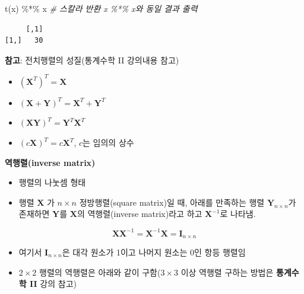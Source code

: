 \documentclass[
  11pt,
]{krantz}
\makeatletter
\newenvironment{Shaded}{\begin{snugshade}}{\end{snugshade}}
\newcommand{\CommentTok}[1]{\textcolor[rgb]{0.37,0.37,0.37}{\textit{#1}}}
\newcommand{\FunctionTok}[1]{\textcolor[rgb]{0,0,0}{#1}}
\newcommand{\NormalTok}[1]{#1}
\newcommand{\SpecialCharTok}[1]{\textcolor[rgb]{0,0,0}{#1}}
\providecommand{\tightlist}{%
  \setlength{\itemsep}{0pt}\setlength{\parskip}{0pt}}
\newenvironment{kframe}{%
\medskip{}
\setlength{\fboxsep}{.8em}
 \def\at@end@of@kframe{}%
 \ifinner\ifhmode%
  \def\at@end@of@kframe{\end{minipage}}%
  \begin{minipage}{\columnwidth}%
 \fi\fi%
 \def\FrameCommand##1{\hskip\@totalleftmargin \hskip-\fboxsep
 \colorbox{shadecolor}{##1}\hskip-\fboxsep
     \hskip-\linewidth \hskip-\@totalleftmargin \hskip\columnwidth}%
 \MakeFramed {\advance\hsize-\width
   \@totalleftmargin\z@ \linewidth\hsize
   \@setminipage}}%
 {\par\unskip\endMakeFramed%
 \at@end@of@kframe}
\newenvironment{rmdblock}[1]
  {
  \begin{itemize}
  \renewcommand{\labelitemi}{
    \raisebox{-.7\height}[0pt][0pt]{
      {\setkeys{Gin}{width=3em,keepaspectratio}\texttt{[image: images/\#1]}}
    }
  }
  \setlength{\fboxsep}{1em}
  \begin{kframe}
  \item
  }
  {
  \end{kframe}
  \end{itemize}
  }
\newenvironment{rmdtip}
  {\begin{rmdblock}{tip}}
  {\end{rmdblock}}
\makeatother
\begin{document}
\begin{Shaded}
\begin{Highlighting}[]
\FunctionTok{t}\NormalTok{(x) }\SpecialCharTok{\%*\%}\NormalTok{ x }\CommentTok{\# 스칼라 반환 x \%*\% x와 동일 결과 출력}
\end{Highlighting}
\end{Shaded}

\begin{verbatim}
     [,1]
[1,]   30
\end{verbatim}

\normalsize

\footnotesize

\begin{rmdtip}
\textbf{참고}: 전치행렬의 성질(통계수학 II 강의내용 참고)

\begin{itemize}
\tightlist
\item
  \((\mathrm{\mathbf{X}}^T)^T = \mathrm{\mathbf{X}}\)
\item
  \((\mathrm{\mathbf{X} + \mathbf{Y}})^T = \mathrm{\mathbf{X}}^T + \mathrm{\mathbf{Y}}^T\)
\item
  \((\mathrm{\mathbf{X}\mathbf{Y}})^T = \mathrm{\mathbf{Y}}^T\mathrm{\mathbf{X}}^T\)
\item
  \((c\mathrm{\mathbf{X}})^T = c\mathrm{\mathbf{X}}^T\), \(c\)는 임의의 상수
\end{itemize}
\end{rmdtip}

\normalsize

\textbf{역행렬(inverse matrix)}

\begin{itemize}
\tightlist
\item
  행렬의 나눗셈 형태
\item
  행렬 \(\mathrm{\mathbf{X}}\) 가 \(n \times n\) 정방행렬(square matrix)일 때, 아래를 만족하는 행렬 \(\mathrm{\mathbf{Y}}_{n \times n}\)가 존재하면 \(\mathrm{\mathbf{Y}}\)를 \(\mathrm{\mathbf{X}}\)의 역행렬(inverse matrix)라고 하고 \(\mathrm{\mathbf{X}}^{-1}\)로 나타냄.
\end{itemize}

\[
 \mathrm{\mathbf{X}\mathbf{X}^{-1}} = \mathrm{\mathbf{X}^{-1}\mathbf{X}} = \mathrm{\mathbf{I}}_{n\times n}
\]

\begin{itemize}
\tightlist
\item
  여기서 \(\mathrm{\mathbf{I}}_{n\times n}\)은 대각 원소가 1이고 나머지 원소는 0인 항등 행렬임
\item
  \(2 \times 2\) 행렬의 역행렬은 아래와 같이 구함(\(3\times 3\) 이상 역행렬 구하는 방법은 \textbf{통계수학 II} 강의 참고)
\end{itemize}
\end{document}
